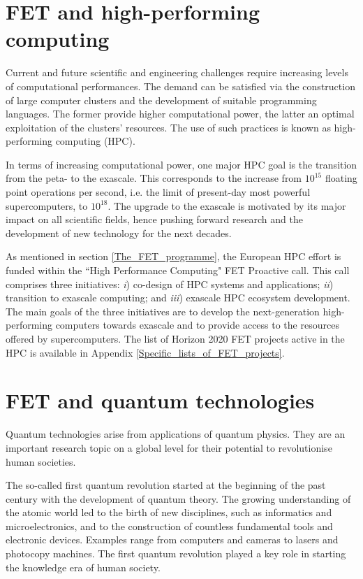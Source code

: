 \section{FET and high-performing computing} \label{FET_and_high-performing_computing}
Current and future scientific and engineering challenges require increasing levels of computational performances. The demand can be satisfied via the construction of large computer clusters and the development of suitable programming languages. The former provide higher computational power, the latter an optimal exploitation of the clusters' resources. The use of such practices is known as high-performing computing (HPC).

In terms of increasing computational power, one major HPC goal is the transition from the peta- to the exascale. This corresponds to the increase from $10^{15}$ floating point operations per second, i.e. the limit of present-day most powerful supercomputers, to $10^{18}$. The upgrade to the exascale is motivated by its major impact on all scientific fields, hence pushing forward research and the development of new technology for the next decades. 

As mentioned in section \ref{The_FET_programme}, the European HPC effort is funded within the ``High Performance Computing" FET Proactive call. This call comprises three initiatives: \textit{i}) co-design of HPC systems and applications; \textit{ii}) transition to exascale computing; and \textit{iii}) exascale HPC ecosystem development. The main goals of the three initiatives are to develop the next-generation high-performing computers towards exascale and to provide access to the resources offered by supercomputers. The list of Horizon 2020 FET projects active in the HPC is available in Appendix \ref{Specific_lists_of_FET_projects}.


\section{FET and quantum technologies} \label{FET_and_quantum_technologies}
Quantum technologies arise from applications of quantum physics. They are an important research topic on a global level for their potential to revolutionise human societies.

The so-called first quantum revolution started at the beginning of the past century with the development of quantum theory. The growing understanding of the atomic world led to the birth of new disciplines, such as informatics and microelectronics, and to the construction of countless fundamental tools and electronic devices. Examples range from computers and cameras to lasers and photocopy machines. The first quantum revolution played a key role in starting the knowledge era of human society.

